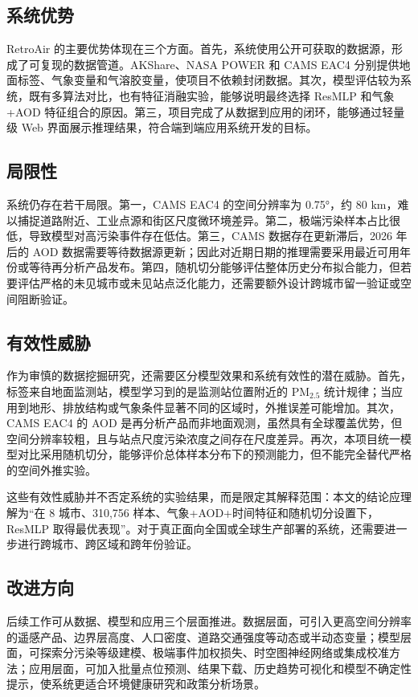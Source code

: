 ﻿\documentclass[UTF8,zihao=-4,a4paper]{ctexart}
\newcommand{\pmfine}{PM$_{2.5}$}
\newcommand{\aod}{AOD}
\begin{document}
\subsection{系统优势}

RetroAir 的主要优势体现在三个方面。首先，系统使用公开可获取的数据源，形成了可复现的数据管道。AKShare、NASA POWER 和 CAMS EAC4 分别提供地面标签、气象变量和气溶胶变量，使项目不依赖封闭数据。其次，模型评估较为系统，既有多算法对比，也有特征消融实验，能够说明最终选择 ResMLP 和气象+\aod{} 特征组合的原因。第三，项目完成了从数据到应用的闭环，能够通过轻量级 Web 界面展示推理结果，符合端到端应用系统开发的目标。

\subsection{局限性}

系统仍存在若干局限。第一，CAMS EAC4 的空间分辨率为 0.75°，约 80 km，难以捕捉道路附近、工业点源和街区尺度微环境差异。第二，极端污染样本占比很低，导致模型对高污染事件存在低估。第三，CAMS 数据存在更新滞后，2026 年后的 \aod{} 数据需要等待数据源更新；因此对近期日期的推理需要采用最近可用年份或等待再分析产品发布。第四，随机切分能够评估整体历史分布拟合能力，但若要评估严格的未见城市或未见站点泛化能力，还需要额外设计跨城市留一验证或空间阻断验证。

\subsection{有效性威胁}

作为审慎的数据挖掘研究，还需要区分模型效果和系统有效性的潜在威胁。首先，标签来自地面监测站，模型学习到的是监测站位置附近的 \pmfine{} 统计规律；当应用到地形、排放结构或气象条件显著不同的区域时，外推误差可能增加。其次，CAMS EAC4 的 \aod{} 是再分析产品而非地面观测，虽然具有全球覆盖优势，但空间分辨率较粗，且与站点尺度污染浓度之间存在尺度差异。再次，本项目统一模型对比采用随机切分，能够评价总体样本分布下的预测能力，但不能完全替代严格的空间外推实验。

这些有效性威胁并不否定系统的实验结果，而是限定其解释范围：本文的结论应理解为“在 8 城市、310,756 样本、气象+\aod{}+时间特征和随机切分设置下，ResMLP 取得最优表现”。对于真正面向全国或全球生产部署的系统，还需要进一步进行跨城市、跨区域和跨年份验证。

\subsection{改进方向}

后续工作可从数据、模型和应用三个层面推进。数据层面，可引入更高空间分辨率的遥感产品、边界层高度、人口密度、道路交通强度等动态或半动态变量；模型层面，可探索分污染等级建模、极端事件加权损失、时空图神经网络或集成校准方法；应用层面，可加入批量点位预测、结果下载、历史趋势可视化和模型不确定性提示，使系统更适合环境健康研究和政策分析场景。
\end{document}
